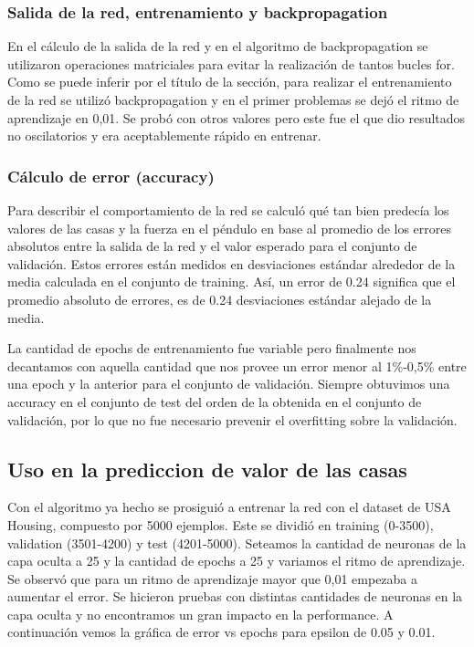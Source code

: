 \documentclass[
]{article}
\begin{document}
\hypertarget{salida-de-la-red-entrenamiento-y-backpropagation}{%
\subsubsection{Salida de la red, entrenamiento y
backpropagation}\label{salida-de-la-red-entrenamiento-y-backpropagation}}

En el cálculo de la salida de la red y en el algoritmo de
backpropagation se utilizaron operaciones matriciales para evitar la
realización de tantos bucles for. Como se puede inferir por el título de
la sección, para realizar el entrenamiento de la red se utilizó
backpropagation y en el primer problemas se dejó el ritmo de aprendizaje
en 0,01. Se probó con otros valores pero este fue el que dio resultados
no oscilatorios y era aceptablemente rápido en entrenar.

\hypertarget{cuxe1lculo-de-error-accuracy}{%
\subsubsection{Cálculo de error
(accuracy)}\label{cuxe1lculo-de-error-accuracy}}

Para describir el comportamiento de la red se calculó qué tan bien
predecía los valores de las casas y la fuerza en el péndulo en base al
promedio de los errores absolutos entre la salida de la red y el valor
esperado para el conjunto de validación. Estos errores están medidos en
desviaciones estándar alrededor de la media calculada en el conjunto de
training. Así, un error de 0.24 significa que el promedio absoluto de
errores, es de 0.24 desviaciones estándar alejado de la media.

La cantidad de epochs de entrenamiento fue variable pero finalmente nos
decantamos con aquella cantidad que nos provee un error menor al
1\%-0,5\% entre una epoch y la anterior para el conjunto de validación.
Siempre obtuvimos una accuracy en el conjunto de test del orden de la
obtenida en el conjunto de validación, por lo que no fue necesario
prevenir el overfitting sobre la validación.

\hypertarget{uso-en-la-prediccion-de-valor-de-las-casas}{%
\subsection{Uso en la prediccion de valor de las
casas}\label{uso-en-la-prediccion-de-valor-de-las-casas}}

Con el algoritmo ya hecho se prosiguió a entrenar la red con el dataset
de USA Housing, compuesto por 5000 ejemplos. Este se dividió en training
(0-3500), validation (3501-4200) y test (4201-5000). Seteamos la
cantidad de neuronas de la capa oculta a 25 y la cantidad de epochs a 25
y variamos el ritmo de aprendizaje. Se observó que para un ritmo de
aprendizaje mayor que 0,01 empezaba a aumentar el error. Se hicieron
pruebas con distintas cantidades de neuronas en la capa oculta y no
encontramos un gran impacto en la performance. A continuación vemos la
gráfica de error vs epochs para epsilon de 0.05 y 0.01.
\end{document}
